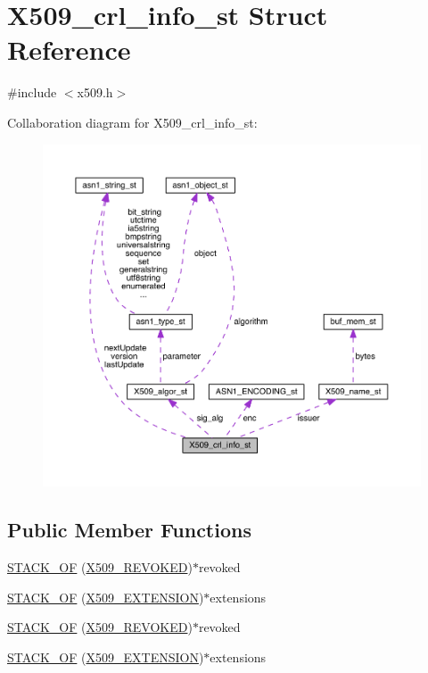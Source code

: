 \hypertarget{struct_x509__crl__info__st}{}\section{X509\+\_\+crl\+\_\+info\+\_\+st Struct Reference}
\label{struct_x509__crl__info__st}


{\ttfamily \#include $<$x509.\+h$>$}



Collaboration diagram for X509\+\_\+crl\+\_\+info\+\_\+st\+:\nopagebreak
\begin{figure}[H]
\begin{center}
\leavevmode
\includegraphics[width=350pt]{struct_x509__crl__info__st__coll__graph}
\end{center}
\end{figure}
\subsection*{Public Member Functions}
\begin{DoxyCompactItemize}
\item 
\hyperlink{struct_x509__crl__info__st_a82a8f4f29ab865601e3147e9fe4a0202}{S\+T\+A\+C\+K\+\_\+\+OF} (\hyperlink{crypto_2ossl__typ_8h_a7acf7587e6ca6c321a6d017c2f36ac4e}{X509\+\_\+\+R\+E\+V\+O\+K\+ED})$\ast$revoked
\item 
\hyperlink{struct_x509__crl__info__st_a9674726b03b076fb4ef08b04c1417a0d}{S\+T\+A\+C\+K\+\_\+\+OF} (\hyperlink{crypto_2x509_2x509_8h_ab2f7f7dc0ced8684e0cbfc818e408304}{X509\+\_\+\+E\+X\+T\+E\+N\+S\+I\+ON})$\ast$extensions
\item 
\hyperlink{struct_x509__crl__info__st_a82a8f4f29ab865601e3147e9fe4a0202}{S\+T\+A\+C\+K\+\_\+\+OF} (\hyperlink{crypto_2ossl__typ_8h_a7acf7587e6ca6c321a6d017c2f36ac4e}{X509\+\_\+\+R\+E\+V\+O\+K\+ED})$\ast$revoked
\item 
\hyperlink{struct_x509__crl__info__st_a9674726b03b076fb4ef08b04c1417a0d}{S\+T\+A\+C\+K\+\_\+\+OF} (\hyperlink{crypto_2x509_2x509_8h_ab2f7f7dc0ced8684e0cbfc818e408304}{X509\+\_\+\+E\+X\+T\+E\+N\+S\+I\+ON})$\ast$extensions
\end{DoxyCompactItemize}
